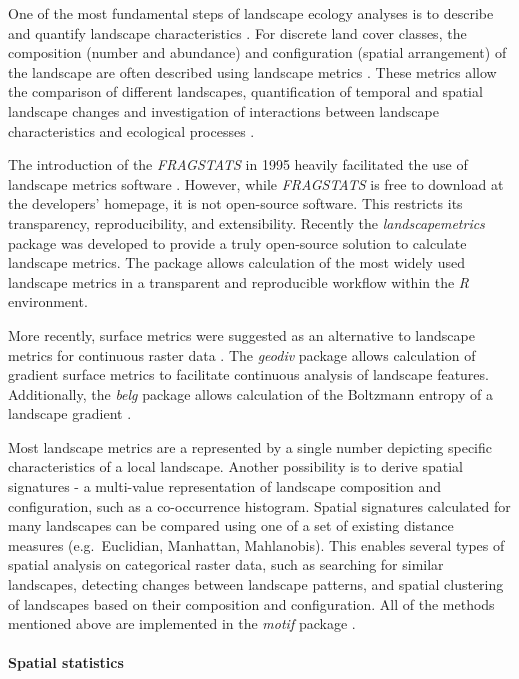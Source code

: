 \documentclass[smallextended]{svjour3}       %
\begin{document}
One of the most fundamental steps of landscape ecology analyses is to describe and quantify landscape characteristics \cite{Turner2005,Lausch2015}.
For discrete land cover classes, the composition (number and abundance) and configuration (spatial arrangement) of the landscape are often described using landscape metrics \cite{Gustafson1998,Uuemaa2009,Uuemaa2013,Gustafson2019}.
These metrics allow the comparison of different landscapes, quantification of temporal and spatial landscape changes and investigation of interactions between landscape characteristics and ecological processes \cite{Uuemaa2009}.

The introduction of the \emph{FRAGSTATS} in 1995 heavily facilitated the use of landscape metrics software \cite{McGarigal2012,Kupfer2012,Gustafson2019}.
However, while \emph{FRAGSTATS} is free to download at the developers' homepage, it is not open-source software.
This restricts its transparency, reproducibility, and extensibility.
Recently the \emph{landscapemetrics} package \cite{Hesselbarth2019a} was developed to provide a truly open-source solution to calculate landscape metrics.
The package allows calculation of the most widely used landscape metrics in a transparent and reproducible workflow within the \emph{R} environment.

More recently, surface metrics were suggested as an alternative to landscape metrics for continuous raster data \cite{McGarigal2009}.
The \emph{geodiv} package \cite{Smith2020} allows calculation of gradient surface metrics to facilitate continuous analysis of landscape features.
Additionally, the \emph{belg} package allows calculation of the Boltzmann entropy of a landscape gradient \cite{R-belgpaper}.

Most landscape metrics are a represented by a single number depicting specific characteristics of a local landscape.
Another possibility is to derive spatial signatures - a multi-value representation of landscape composition and configuration, such as a co-occurrence histogram.
Spatial signatures calculated for many landscapes can be compared using one of a set of existing distance measures (e.g.~Euclidian, Manhattan, Mahlanobis).
This enables several types of spatial analysis on categorical raster data, such as searching for similar landscapes, detecting changes between landscape patterns, and spatial clustering of landscapes based on their composition and configuration.
All of the methods mentioned above are implemented in the \emph{motif} package \cite{R-motif}.

\hypertarget{spatial-statistics}{%
\paragraph{Spatial statistics}\label{spatial-statistics}}
\end{document}
